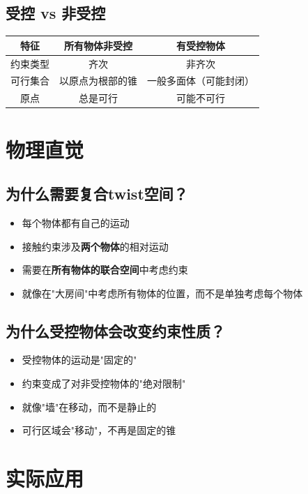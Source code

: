 \documentclass[12pt,a4paper]{article}
\begin{document}
\subsection{受控 vs 非受控}

\begin{center}
\begin{tabular}{|c|c|c|}
\hline
\textbf{特征} & \textbf{所有物体非受控} & \textbf{有受控物体} \\
\hline
约束类型 & 齐次 & 非齐次 \\
\hline
可行集合 & 以原点为根部的锥 & 一般多面体（可能封闭） \\
\hline
原点 & 总是可行 & 可能不可行 \\
\hline
\end{tabular}
\end{center}

\section{物理直觉}

\subsection{为什么需要复合twist空间？}

\begin{itemize}
\item 每个物体都有自己的运动
\item 接触约束涉及\textbf{两个物体}的相对运动
\item 需要在\textbf{所有物体的联合空间}中考虑约束
\item 就像在"大房间"中考虑所有物体的位置，而不是单独考虑每个物体
\end{itemize}

\subsection{为什么受控物体会改变约束性质？}

\begin{itemize}
\item 受控物体的运动是"固定的"
\item 约束变成了对非受控物体的"绝对限制"
\item 就像"墙"在移动，而不是静止的
\item 可行区域会"移动"，不再是固定的锥
\end{itemize}

\section{实际应用}
\end{document}
